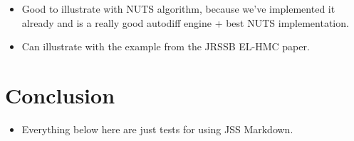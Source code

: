 \documentclass[article]{jss}
\providecommand{\tightlist}{%
  \setlength{\itemsep}{0pt}\setlength{\parskip}{0pt}}
\renewcommand{\|}{\,|\,}
\begin{document}
\begin{itemize}
\item
  Good to illustrate with  NUTS algorithm, because we've implemented it already and  is a really good autodiff engine + best NUTS implementation.
\item
  Can illustrate with the example from the JRSSB EL-HMC paper.
\end{itemize}

\hypertarget{conclusion}{%
\section{Conclusion}\label{conclusion}}

\begin{itemize}
\tightlist
\item
  Everything below here are just tests for using JSS Markdown.
\end{itemize}
\end{document}
